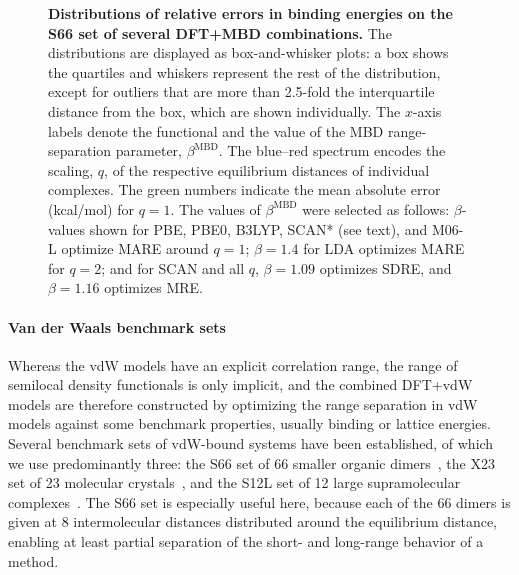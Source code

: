 \begin{figure}[t!]
\caption{\textbf{Distributions of relative errors in binding energies on the S66 set of several DFT+MBD combinations.}
The distributions are displayed as box-and-whisker plots: a box shows the quartiles and whiskers represent the rest of the distribution, except for outliers that are more than 2.5-fold the interquartile distance from the box, which are shown individually.
The $x$-axis labels denote the functional and the value of the MBD range-separation parameter, $\beta^\text{MBD}$.
The blue--red spectrum encodes the scaling, $q$, of the respective equilibrium distances of individual complexes.
The green numbers indicate the mean absolute error (kcal/mol) for $q=1$.
The values of $\beta^\text{MBD}$ were selected as follows: $\beta$-values shown for PBE, PBE0, B3LYP, SCAN* (see text), and M06-L optimize MARE around $q=1$; $\beta=1.4$ for LDA optimizes MARE for $q=2$; and for SCAN and all $q$, $\beta=1.09$ optimizes SDRE, and $\beta=1.16$ optimizes MRE\@.
}\label{fig:s66-dists}
\end{figure}

\paragraph{Van der Waals benchmark sets}

Whereas the vdW models have an explicit correlation range, the range of semilocal density functionals is only implicit, and the combined DFT+vdW models are therefore constructed by optimizing the range separation in vdW models against some benchmark properties, usually binding or lattice energies.
Several benchmark sets of vdW-bound systems have been established, of which we use predominantly three: the S66 set of 66 smaller organic dimers~\cite{RezacJCTC11}, the X23 set of 23 molecular crystals~\cite{Otero-de-la-RozaJCP12,ReillyJCP13}, and the S12L set of 12 large supramolecular complexes~\cite{GrimmeCEJ12}.
The S66 set is especially useful here, because each of the 66 dimers is given at 8 intermolecular distances distributed around the equilibrium distance, enabling at least partial separation of the short- and long-range behavior of a method.

